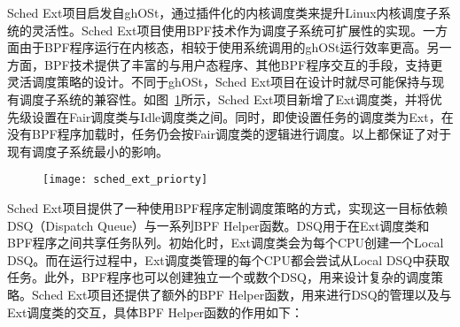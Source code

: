 Sched Ext项目启发自ghOSt\citep{humphries2021ghost}，通过插件化的内核调度类来提升Linux内核调度子系统的灵活性。Sched Ext项目使用BPF技术作为调度子系统可扩展性的实现。一方面由于BPF程序运行在内核态，相较于使用系统调用的ghOSt运行效率更高。另一方面，BPF技术提供了丰富的与用户态程序、其他BPF程序交互的手段，支持更灵活调度策略的设计。不同于ghOSt，Sched Ext项目在设计时就尽可能保持与现有调度子系统的兼容性。如图~\ref{fig:sched_ext_priorty}所示，Sched Ext项目新增了Ext调度类，并将优先级设置在Fair调度类与Idle调度类之间。同时，即使设置任务的调度类为Ext，在没有BPF程序加载时，任务仍会按Fair调度类的逻辑进行调度。以上都保证了对于现有调度子系统最小的影响。 

\begin{figure}[!htbp]
    \centering
    \texttt{[image: sched\_ext\_priorty]}
    \label{fig:sched_ext_priorty}
\end{figure}

Sched Ext项目提供了一种使用BPF程序定制调度策略的方式，实现这一目标依赖DSQ（Dispatch Queue）与一系列BPF Helper函数。DSQ用于在Ext调度类和BPF程序之间共享任务队列。初始化时，Ext调度类会为每个CPU创建一个Local DSQ。而在运行过程中，Ext调度类管理的每个CPU都会尝试从Local DSQ中获取任务。此外，BPF程序也可以创建独立一个或数个DSQ，用来设计复杂的调度策略。Sched Ext项目还提供了额外的BPF Helper函数，用来进行DSQ的管理以及与Ext调度类的交互，具体BPF Helper函数的作用如下：

